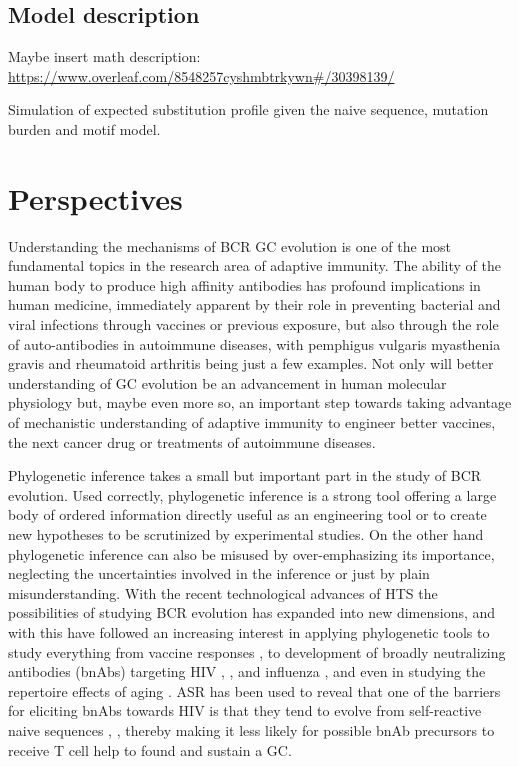 \section{Model description}
Maybe insert math description:
\url{https://www.overleaf.com/8548257cyshmbtrkywn#/30398139/}




Simulation of expected substitution profile given the naive sequence, mutation burden and motif model.








\fi


\chapter{Perspectives}
Understanding the mechanisms of BCR GC evolution is one of the most fundamental topics in the research area of adaptive immunity.
The ability of the human body to produce high affinity antibodies has profound implications in human medicine, immediately apparent by their role in preventing bacterial and viral infections through vaccines or previous exposure, but also through the role of auto-antibodies in autoimmune diseases, with pemphigus vulgaris \cite{payne2005genetic} myasthenia gravis \cite{lindstrom1998antibody} and rheumatoid arthritis \cite{steiner2002autoantibodies} being just a few examples.
Not only will better understanding of GC evolution be an advancement in human molecular physiology but, maybe even more so, an important step towards taking advantage of mechanistic understanding of adaptive immunity to engineer better vaccines, the next cancer drug or treatments of autoimmune diseases.

Phylogenetic inference takes a small but important part in the study of BCR evolution.
Used correctly, phylogenetic inference is a strong tool offering a large body of ordered information directly useful as an engineering tool or to create new hypotheses to be scrutinized by experimental studies.
On the other hand phylogenetic inference can also be misused by over-emphasizing its importance, neglecting the uncertainties involved in the inference or just by plain misunderstanding.
With the recent technological advances of HTS the possibilities of studying BCR evolution has expanded into new dimensions, and with this have followed an increasing interest in applying phylogenetic tools to study everything from vaccine responses \cite{raymond2016influenza}, to development of broadly neutralizing antibodies (bnAbs) targeting HIV \cite{Doria-Rose2014-vi}, \cite{Wu2011-yj}, \cite{Zhu_undated-zz} and influenza \cite{pappas2014rapid}, \cite{xu2015key} and even in studying the repertoire effects of aging \cite{de2017phylogenetic}.
ASR has been used to reveal that one of the barriers for eliciting bnAbs towards HIV is that they tend to evolve from self-reactive naive sequences \cite{williams2017potent}, \cite{liao2011initial}, thereby making it less likely for possible bnAb precursors to receive T cell help to found and sustain a GC.

